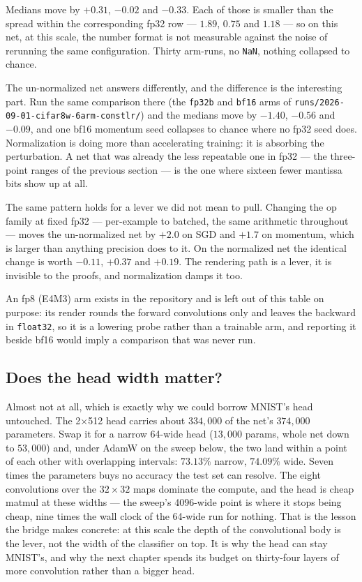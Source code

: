 \noindent Medians move by $+0.31$, $-0.02$ and $-0.33$. Each of those is
smaller than the spread within the corresponding fp32 row --- $1.89$,
$0.75$ and $1.18$ --- so on this net, at this scale, the number format is
not measurable against the noise of rerunning the same configuration.
Thirty arm-runs, no \texttt{NaN}, nothing collapsed to chance.

\medskip\noindent The un-normalized net answers differently, and the
difference is the interesting part. Run the same comparison there (the
\texttt{fp32b} and \texttt{bf16} arms of
\texttt{runs/2026-09-01-cifar8w-6arm-constlr/}) and the medians move by
$-1.40$, $-0.56$ and $-0.09$, and one bf16 momentum seed collapses to
chance where no fp32 seed does. Normalization is doing more
than accelerating training: it is absorbing the perturbation. A net that
was already the less repeatable one in fp32 --- the three-point ranges
of the previous section --- is the one where sixteen fewer mantissa
bits show up at all.

\medskip\noindent The same pattern holds for a lever we did not mean to
pull. Changing the op family at fixed fp32 --- per-example to batched, the
same arithmetic throughout --- moves the un-normalized net by $+2.0$ on
SGD and $+1.7$ on momentum, which is larger than anything precision does
to it. On the normalized net the identical change is worth $-0.11$,
$+0.37$ and $+0.19$. The rendering path is a lever, it is invisible to the
proofs, and normalization damps it too.

\medskip\noindent An fp8 (E4M3) arm exists in the repository and is left
out of this table on purpose: its render rounds the forward convolutions
only and leaves the backward in \texttt{float32}, so it is a lowering
probe rather than a trainable arm, and reporting it beside bf16 would
imply a comparison that was never run.

\subsection*{Does the head width matter?}

Almost not at all, which is exactly why we could borrow MNIST's head
untouched. The 2$\times$512 head carries about $334{,}000$ of the net's
$374{,}000$ parameters. Swap it for a narrow 64-wide head ($13{,}000$
params, whole net down to $53{,}000$) and, under AdamW on the sweep
below, the two land within a point of each other with overlapping
intervals: $73.13\%$ narrow, $74.09\%$ wide. Seven times the parameters
buys no accuracy the test set can resolve. The eight convolutions over
the $32 \times 32$ maps dominate the compute, and the head is cheap
matmul at these widths --- the sweep's 4096-wide point is where it stops
being cheap, nine times the wall clock of the 64-wide run for nothing.
That is the lesson the
bridge makes concrete: at this scale the depth of the
convolutional body is the lever, not the width of the classifier on top.
It is why the head can stay MNIST's, and why the next chapter spends its
budget on thirty-four layers of more convolution rather than a
bigger head.

